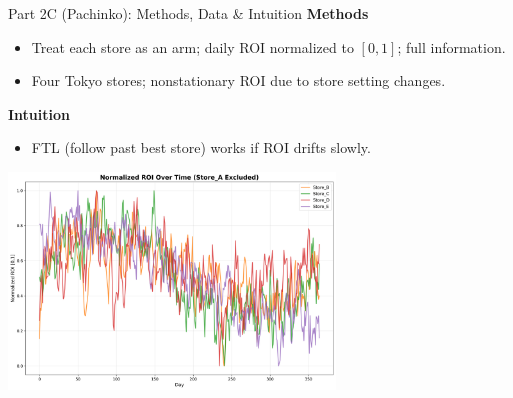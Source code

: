\documentclass{beamer}
\begin{document}
\begin{frame}{Part 2C (Pachinko): Methods, Data \& Intuition}
\textbf{Methods}
\begin{itemize}
  \item Treat each store as an arm; daily ROI normalized to $[0,1]$; full information.
  \item Four Tokyo stores; nonstationary ROI due to store setting changes.
\end{itemize}
\textbf{Intuition}
\begin{itemize}
  \item FTL (follow past best store) works if ROI drifts slowly.
\end{itemize}
\centering
\includegraphics[width=0.65\textwidth]{332Project2/figures/PP_data_timeseries_store_A_excluded.png}
\end{frame}
\end{document}
